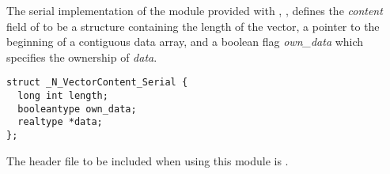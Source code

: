
The serial implementation of the {\nvector} module provided with {\sundials},
{\nvecs}, defines the {\em content} field of  to be a structure 
containing the length of the vector, a pointer to the beginning of a contiguous 
data array, and a boolean flag {\em own\_data} which specifies the ownership 
of {\em data}.
\begin{verbatim} 
struct _N_VectorContent_Serial {
  long int length;
  booleantype own_data;
  realtype *data;
};
\end{verbatim}

The header file to be included when using this module is .

